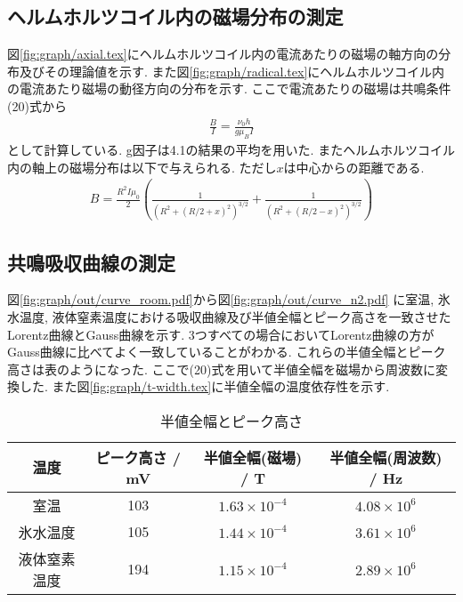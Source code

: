 \subsection{ヘルムホルツコイル内の磁場分布の測定}
図\ref{fig:graph/axial.tex}にヘルムホルツコイル内の電流あたりの磁場の軸方向の分布及びその理論値を示す.
また図\ref{fig:graph/radical.tex}にヘルムホルツコイル内の電流あたり磁場の動径方向の分布を示す.
ここで電流あたりの磁場は共鳴条件(20)式から
\begin{align}
  \frac{B}{I}=\frac{\nu_0 h}{g\mu_B I}
\end{align}
として計算している.
g因子は4.1の結果の平均を用いた.
またヘルムホルツコイル内の軸上の磁場分布は以下で与えられる.
ただし$x$は中心からの距離である.
\begin{align}
  B=\frac{R^2I\mu_0}{2}\left(\frac{1}{(R^2+(R/2+x)^2)^{3/2}}+\frac{1}{(R^2+(R/2-x)^2)^{3/2}}\right)
\end{align}
\newpage
\subsection{共鳴吸収曲線の測定}
図\ref{fig:graph/out/curve_room.pdf}から図\ref{fig:graph/out/curve_n2.pdf}
に室温, 氷水温度, 液体窒素温度における吸収曲線及び半値全幅とピーク高さを一致させたLorentz曲線とGauss曲線を示す.
3つすべての場合においてLorentz曲線の方がGauss曲線に比べてよく一致していることがわかる.
これらの半値全幅とピーク高さは表のようになった.
ここで(20)式を用いて半値全幅を磁場から周波数に変換した.
また図\ref{fig:graph/t-width.tex}に半値全幅の温度依存性を示す.
\begin{table}[h]
\caption{半値全幅とピーク高さ}
\label{tab:hanti_peak}
\centering
\begin{tabular}{c|ccc}
\hline
温度&ピーク高さ / mV&半値全幅(磁場) / T&半値全幅(周波数) / Hz\\
\hline \hline
室温&103&$1.63\times10^{-4}$&$4.08\times10^6$\\
氷水温度&105&$1.44\times10^{-4}$&$3.61\times10^6$\\
液体窒素温度&194&$1.15\times10^{-4}$&$2.89\times10^6$\\
\hline
\end{tabular}
\end{table}
\newpage
{}
\newpage
